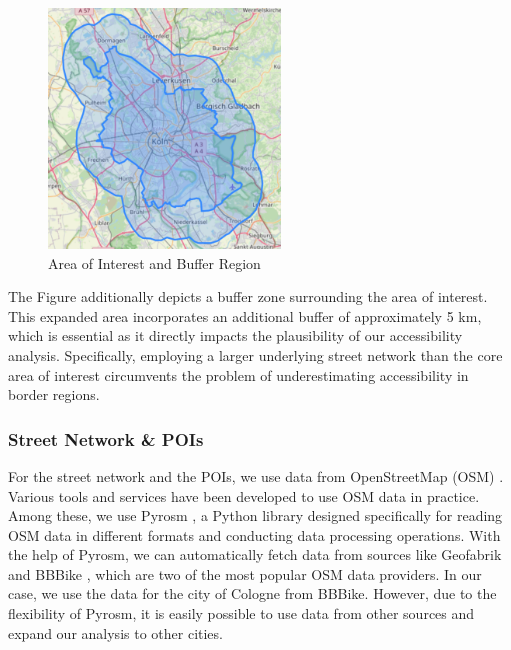 \begin{figure}
  \begin{center}
    \includegraphics[width=0.55\textwidth]{Figures/experiment/area_plus_buffer.png}
  \end{center}
  \caption{Area of Interest and Buffer Region}\label{fig:area_plus_buffer}
\end{figure}


The Figure additionally depicts a buffer zone surrounding the area of interest.
This expanded area incorporates an additional buffer of approximately 5 km, which is essential as it directly impacts the plausibility of our accessibility analysis.
Specifically, employing a larger underlying street network than the core area of interest circumvents the problem of underestimating accessibility in border regions.

\subsubsection{Street Network \& POIs}
\label{subs:street_network_pois}

For the street network and the POIs, we use data from OpenStreetMap (OSM) .
Various tools and services have been developed to use OSM data in practice.
Among these, we use Pyrosm , a Python library designed specifically for reading OSM data in different formats and conducting data processing operations.
With the help of Pyrosm, we can automatically fetch data from sources like Geofabrik  and BBBike \cite{schneiderBBBikeExtractsOpenStreetMap2023}, which are two of the most popular OSM data providers.
In our case, we use the data for the city of Cologne from BBBike.
However, due to the flexibility of Pyrosm, it is easily possible to use data from other sources and expand our analysis to other cities.

